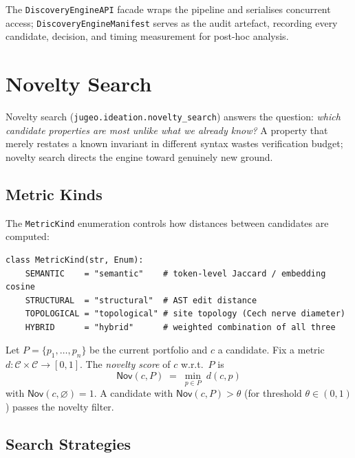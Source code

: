 \documentclass[11pt]{article}
\newcommand{\Nov}{\mathsf{Nov}}            %
\newcommand{\Cand}{\mathcal{C}}            %
\newcommand{\alg}[1]{\texttt{\small #1}}   %
\begin{document}
The \texttt{DiscoveryEngineAPI} facade wraps the pipeline and serialises
concurrent access; \texttt{DiscoveryEngineManifest} serves as the
audit artefact, recording every candidate, decision, and timing
measurement for post-hoc analysis.

\section{Novelty Search}\label{sec:novelty}

Novelty search (\texttt{jugeo.ideation.novelty\_search}) answers the
question: \emph{which candidate properties are most unlike what we
already know?}  A property that merely restates a known invariant in
different syntax wastes verification budget; novelty search directs
the engine toward genuinely new ground.

\subsection{Metric Kinds}

The \alg{MetricKind} enumeration controls how distances between
candidates are computed:

\begin{lstlisting}[style=jugeo-python, caption={%
  Distance metric kinds for novelty computation.}]
class MetricKind(str, Enum):
    SEMANTIC    = "semantic"    # token-level Jaccard / embedding cosine
    STRUCTURAL  = "structural"  # AST edit distance
    TOPOLOGICAL = "topological" # site topology (Cech nerve diameter)
    HYBRID      = "hybrid"      # weighted combination of all three
\end{lstlisting}

\begin{definition}
Let $P = \{p_1, \ldots, p_n\}$ be the current portfolio and
$c$ a candidate.  Fix a metric $d : \Cand \times \Cand \to [0,1]$.
The \emph{novelty score} of $c$ w.r.t.\ $P$ is
\[
  \Nov(c, P) \;=\; \min_{p \in P}\; d(c, p)
\]
with $\Nov(c, \varnothing) = 1$.  A candidate with $\Nov(c,P) > \theta$
(for threshold $\theta \in (0,1)$) passes the novelty filter.
\end{definition}

\subsection{Search Strategies}
\end{document}
